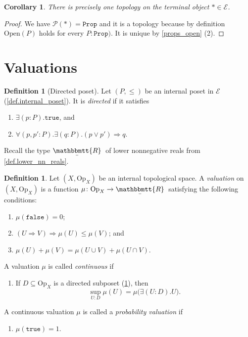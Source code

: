 \documentclass[11pt, oneside, article]{memoir}
\theoremstyle{plain}
\newtheorem{corollary}[theorem]{Corollary}
\theoremstyle{definition}
\newtheorem{definition}[theorem]{Definition}
\theoremstyle{remark}
\renewcommand{\ss}{\subseteq}
\newcommand{\const}[1]{\mathtt{#1}}
\newcommand{\Set}[1]{\mathrm{#1}}
\newcommand{\cat}[1]{\mathcal{#1}}
\newcommand{\ubar}[1]{\underaccent{\bar}{#1}}
\newcommand{\internal}[1]{\raisebox{-.03ex}{$\mathbbmtt{#1}$}}
\newcommand{\hs}{\hspace{1.1pt}}
\newcommand{\trr}{\internal{R}\hs}
\newcommand{\tlrr}{\ubar{\trr}\hs}
\newcommand{\pow}{\mathcal{P}}
\newcommand{\prop}{\const{Prop}}
\newcommand{\Op}{\Set{Op}}
\newcommand{\Open}{\Set{Open}}
\newcommand{\imp}{\Rightarrow}
\newcommand{\true}{\const{true}}
\newcommand{\false}{\const{false}}
\begin{document}
\begin{corollary}\label{cor.top_on_one}
There is precisely one topology on the terminal object $*\in\cat{E}$.
\end{corollary}
\begin{proof}
We have $\pow(*)=\prop$ and it is a topology because by definition $\Open(P)$ holds for every $P:\prop)$. It is unique by \cref{props_open} (2).
\end{proof}

\section{Valuations}

\begin{definition}[Directed poset]\label{def.directed}
Let $(P,\leq)$ be an internal poset in $\cat{E}$ (\cref{def.internal_poset}). It is \emph{directed} if it satisfies
\begin{enumerate}
	\item $\exists(p:P).\true$, and
	\item $\forall(p,p':P).\exists(q:P).(p\vee p')\imp q$.
\end{enumerate}
\end{definition}


Recall the type $\tlrr$ of lower nonnegative reals from \cref{def.lower_nn_reals}. 

\begin{definition}
Let $(X,\Op_X)$ be an internal topological space. A \emph{valuation} on $(X,\Op_X)$ is a function $\mu\colon\Op_X\to\tlrr$ satisfying the following conditions:
\begin{enumerate}
	\item $\mu(\false)=0$;
	\item $(U\imp V)\imp\mu(U)\leq\mu(V)$; and
	\item $\mu(U)+\mu(V)=\mu(U\cup V)+\mu(U\cap V)$.
\end{enumerate}
A valuation $\mu$ is called \emph{continuous} if
\begin{enumerate}[resume]
	\item If $D\ss\Op_X$ is a directed subposet (\cref{def.directed}), then
	\begin{equation}\label{eqn.scott_continuity}
	\sup_{U: D}\mu(U)=\mu\big(\exists(U:D).U\big).
	\end{equation}
\end{enumerate}
A continuous valuation $\mu$ is called a \emph{probability valuation} if
\begin{enumerate}[resume]
	\item $\mu(\true)=1$.
\end{enumerate}
\end{definition}
\end{document}
